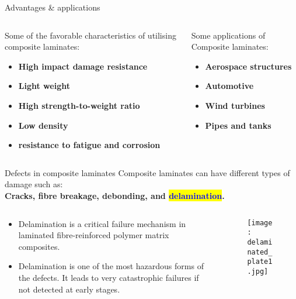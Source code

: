 \documentclass[10pt,aspectratio=169,dvipsnames]{beamer} %
\begin{document}
	\begin{frame}{Advantages \& applications}
		\begin{columns}[T]
			\begin{column}[t]{.45\textwidth}
				Some of the favorable characteristics of utilising composite laminates:
				\begin{itemize}
					\item \textbf{High impact damage resistance}
					\item \textbf{Light weight}
					\item \textbf{High strength-to-weight ratio}
					\item \textbf{Low density}
					\item \textbf{resistance to fatigue and corrosion}
				\end{itemize}
			\end{column}
			\begin{column}[t]{.45\textwidth}
				Some applications of Composite laminates:
				\begin{itemize}
					\item \textbf{Aerospace structures}
					\item \textbf{Automotive}
					\item \textbf{Wind turbines}
					\item \textbf{Pipes and tanks}
				\end{itemize}
			\end{column}
		\end{columns}
	\end{frame}
	\begin{frame}{Defects in composite laminates}
		\small
		Composite laminates can have different types of damage such as: \\
		\textbf{Cracks, fibre breakage, debonding, and \colorbox{yellow}{\textcolor{blue}{delamination}}.} 
		\begin{columns}[T]
			\begin{column}[c]{.45\textwidth}
				\begin{itemize}
					\footnotesize
					\item Delamination is a critical failure mechanism in laminated fibre-reinforced polymer matrix composites.
					\item Delamination is one of the most hazardous forms of the defects. 
					It leads to very catastrophic failures if not detected at early stages.
				\end{itemize}
			\end{column}
			\begin{column}[c]{0.50\textwidth}
				\begin{figure}
					\texttt{[image: delaminated\_plate1.jpg]}
				\end{figure}
			\end{column}
		\end{columns}
	\end{frame}
	
\end{document}
